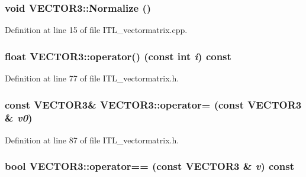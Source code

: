 \hypertarget{classVECTOR3_a806c8a5b345ce23d4cadf5b4ed892d2c}{
\subsubsection[{Normalize}]{\setlength{\rightskip}{0pt plus 5cm}void VECTOR3::Normalize ()}}
\label{classVECTOR3_a806c8a5b345ce23d4cadf5b4ed892d2c}


Definition at line 15 of file ITL\_\-vectormatrix.cpp.

\hypertarget{classVECTOR3_a3ed6b977aafcd21ffca8bbc081a55694}{
\subsubsection[{operator()}]{\setlength{\rightskip}{0pt plus 5cm}float VECTOR3::operator() (const int {\em i}) const}}
\label{classVECTOR3_a3ed6b977aafcd21ffca8bbc081a55694}


Definition at line 77 of file ITL\_\-vectormatrix.h.

\hypertarget{classVECTOR3_a09838095d5261acb5d316ff1b1748c6a}{
\subsubsection[{operator=}]{\setlength{\rightskip}{0pt plus 5cm}const {\bf VECTOR3}\& VECTOR3::operator= (const {\bf VECTOR3} \& {\em v0})}}
\label{classVECTOR3_a09838095d5261acb5d316ff1b1748c6a}


Definition at line 87 of file ITL\_\-vectormatrix.h.

\hypertarget{classVECTOR3_a4fd7d880a7bdab66567d23dccaaf27d4}{
\subsubsection[{operator==}]{\setlength{\rightskip}{0pt plus 5cm}bool VECTOR3::operator== (const {\bf VECTOR3} \& {\em v}) const}}
\label{classVECTOR3_a4fd7d880a7bdab66567d23dccaaf27d4}


